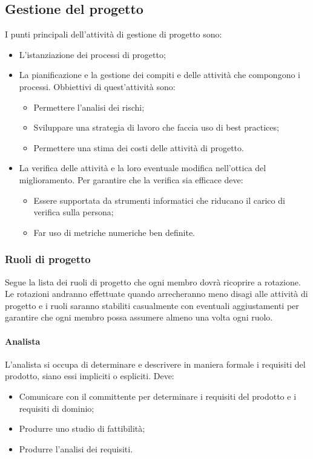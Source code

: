 \subsection{Gestione del progetto}
I punti principali dell'attività di gestione di progetto sono:
\begin{itemize} 
\item L'istanziazione dei processi di progetto;
\item La pianificazione e la gestione dei compiti e delle attività che compongono i processi. 
\newline
Obbiettivi di quest'attività sono:
\begin{itemize} 
\item Permettere l'analisi dei rischi;
\item Sviluppare una strategia di lavoro che faccia uso di best practices;
\item Permettere una stima dei costi delle attività di progetto.
\end{itemize}
\item La verifica delle attività e la loro eventuale modifica nell'ottica del miglioramento. 
\newline
Per garantire che la verifica sia efficace deve:
\begin{itemize} 
\item Essere supportata da strumenti informatici che riducano il carico di verifica sulla persona;
\item Far uso di metriche numeriche ben definite.
\end{itemize}
\end{itemize}

\subsubsection{Ruoli di progetto}
Segue la lista dei ruoli di progetto che ogni membro dovrà ricoprire a rotazione.
Le rotazioni andranno effettuate quando arrecheranno meno disagi alle attività di progetto e i ruoli saranno stabiliti casualmente con eventuali aggiustamenti per garantire che ogni membro possa assumere almeno una volta ogni ruolo.

\paragraph{Analista} \Spazio
L'analista si occupa di determinare e descrivere in maniera formale i requisiti del prodotto, siano essi impliciti o espliciti. Deve:
\begin{itemize} 
\item Comunicare con il committente per determinare i requisiti del prodotto e i requisiti di dominio;
\item Produrre uno studio di fattibilità;
\item Produrre l'analisi dei requisiti.
\end{itemize}

